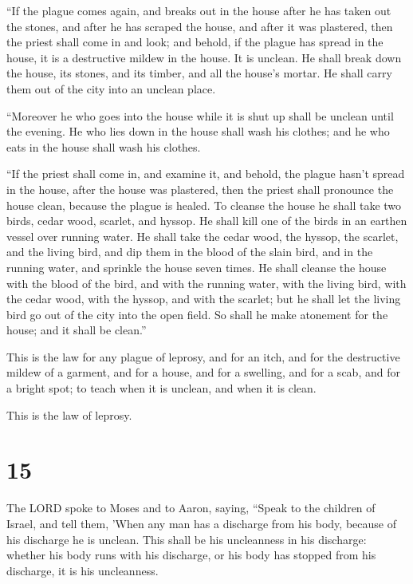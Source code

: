  ``If the plague comes again, and breaks out in the house
after he has taken out the stones, and after he has scraped the house,
and after it was plastered,  then the priest shall come in
and look; and behold, if the plague has spread in the house, it is a
destructive mildew in the house. It is unclean.  He shall
break down the house, its stones, and its timber, and all the house's
mortar. He shall carry them out of the city into an unclean place.

 ``Moreover he who goes into the house while it is shut up
shall be unclean until the evening.  He who lies down in
the house shall wash his clothes; and he who eats in the house shall
wash his clothes.

 ``If the priest shall come in, and examine it, and behold,
the plague hasn't spread in the house, after the house was plastered,
then the priest shall pronounce the house clean, because the plague is
healed.  To cleanse the house he shall take two birds,
cedar wood, scarlet, and hyssop.  He shall kill one of the
birds in an earthen vessel over running water.  He shall
take the cedar wood, the hyssop, the scarlet, and the living bird, and
dip them in the blood of the slain bird, and in the running water, and
sprinkle the house seven times.  He shall cleanse the house
with the blood of the bird, and with the running water, with the living
bird, with the cedar wood, with the hyssop, and with the scarlet;
 but he shall let the living bird go out of the city into
the open field. So shall he make atonement for the house; and it shall
be clean.''

 This is the law for any plague of leprosy, and for an
itch,  and for the destructive mildew of a garment, and for
a house,  and for a swelling, and for a scab, and for a
bright spot;  to teach when it is unclean, and when it is
clean.

This is the law of leprosy.

\hypertarget{section-14}{%
\section{15}\label{section-14}}

 The LORD spoke to Moses and to Aaron, saying, 
``Speak to the children of Israel, and tell them, 'When any man has a
discharge from his body, because of his discharge he is unclean.
 This shall be his uncleanness in his discharge: whether his
body runs with his discharge, or his body has stopped from his
discharge, it is his uncleanness.


